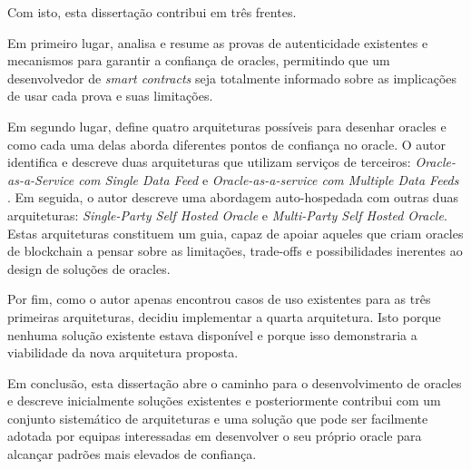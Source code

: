 Com isto, esta dissertação contribui em três frentes.

Em primeiro lugar, analisa e resume as provas de autenticidade existentes e mecanismos para garantir a confiança de oracles, permitindo que um desenvolvedor de \textit{smart contracts} seja totalmente informado sobre as implicações de usar cada prova e suas limitações.

Em segundo lugar, define quatro arquiteturas possíveis para desenhar oracles e como cada uma delas aborda diferentes pontos de confiança no oracle. O autor identifica e descreve duas arquiteturas que utilizam serviços de terceiros: \textit{Oracle-as-a-Service com Single Data Feed} e \textit{Oracle-as-a-service com Multiple Data Feeds} . Em seguida, o autor descreve uma abordagem auto-hospedada com outras duas arquiteturas: \textit{Single-Party Self Hosted Oracle} e \textit{Multi-Party Self Hosted Oracle}. Estas arquiteturas constituem um guia, capaz de apoiar aqueles que criam oracles de blockchain a pensar sobre as limitações, trade-offs e possibilidades inerentes ao design de soluções de oracles.

Por fim, como o autor apenas encontrou casos de uso existentes para as três primeiras arquiteturas, decidiu implementar a quarta arquitetura. Isto porque nenhuma solução existente estava disponível e porque isso demonstraria a viabilidade da nova arquitetura proposta.

Em conclusão, esta dissertação abre o caminho para o desenvolvimento de oracles e descreve inicialmente soluções existentes e posteriormente contribui com um conjunto sistemático de arquiteturas e uma solução que pode ser facilmente adotada por equipas interessadas em desenvolver o seu próprio oracle para alcançar padrões mais elevados de confiança.


